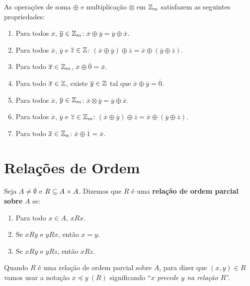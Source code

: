 \begin{proposicao}
	As operações de soma $\oplus$ e multiplicação $\otimes$ em $\mathbb{Z}_m$ satisfazem as seguintes propriedades:
	\begin{enumerate}
		\item Para todos $\overline{x}$, $\overline{y} \in \mathbb{Z}_m$: $\overline{x} \oplus \overline{y} = \overline{y} \oplus \overline{x}$.
		\item Para todos $\overline{x}$, $\overline{y}$ e $\overline{z} \in \mathbb{Z}$: $(\overline{x} \oplus \overline{y}) \oplus \overline{z} = \overline{x} \oplus (\overline{y} \oplus \overline{z})$.
		\item Para todo $\overline{x} \in \mathbb{Z}_m$, $\overline{x} \oplus \overline{0} = \overline{x}$.
		\item Para todo $\overline{x} \in \mathbb{Z}$, existe $\overline{y} \in \mathbb{Z}$ tal que $\overline{x} \oplus \overline{y} = \overline{0}$.
		\item Para todos $\overline{x}$, $\overline{y} \in \mathbb{Z}_m$: $\overline{x} \otimes \overline{y} = \overline{y} \oplus \overline{x}$.
		\item Para todos $\overline{x}$, $\overline{y}$ e $\overline{z} \in \mathbb{Z}_m$: $(\overline{x} \oplus \overline{y}) \oplus \overline{z} = \overline{x} \oplus (\overline{y} \oplus \overline{z})$.
		\item Para todo $\overline{x} \in \mathbb{Z}_n$: $\overline{x} \oplus \overline{1} = \overline{x}$.
	\end{enumerate}
\end{proposicao}
\section{Relações de Ordem} %
\label{sec:relacoes_de_ordem}

\begin{definicao}
	Seja $A \ne \emptyset$ e $R \subseteq A \times A$. Dizemos que $R$ é uma \textbf{relação de ordem parcial sobre} $A$ se:
	\begin{enumerate}[label={\roman*})]
		\item Para todo $x \in A$, $xRx$.
		\item Se $xRy$ e $yRx$, então $x = y$.
		\item Se $xRy$ e $yRz$, então $xRz$.
	\end{enumerate}
\end{definicao}

Quando $R$ é uma relação de ordem parcial sobre $A$, para dizer que $(x,y) \in R$ vamos usar a notação $x\preceq y\ (R)$ significando ``$x$ \textit{precede $y$ na relação $R$}''.

